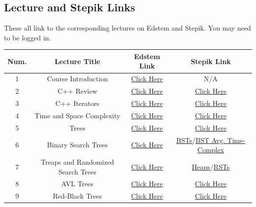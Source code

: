 \documentclass[letterpaper]{article}
\begin{document}
\subsection{Lecture and Stepik Links}
These all link to the corresponding lectures on Edstem and Stepik. You may need to be logged in.
\begin{center}
    \begin{tabular}{|c|c|c|c|}
        \hline 
        \textbf{Num.} & \textbf{Lecture Title} & \textbf{Edstem Link} & \textbf{Stepik Link} \\ 
        \hline 
        1 & Course Introduction & \href{https://edstem.org/us/courses/6609/lessons/22848/slides/131953}{Click Here} & N/A \\ 
        2 & C++ Review & \href{https://edstem.org/us/courses/6609/lessons/22849/slides/131958}{Click Here} & \href{https://stepik.org/lesson/26055/step/1?unit=8087}{Click Here} \\ 
        3 & C++ Iterators & \href{https://edstem.org/us/courses/6609/lessons/22850/slides/131970}{Click Here} & \href{https://stepik.org/lesson/26105/step/1?unit=11291}{Click Here} \\ 
        4 & Time and Space Complexity & \href{https://edstem.org/us/courses/6609/lessons/22853/slides/131982}{Click Here} & \href{https://stepik.org/lesson/26053/step/1?unit=8085}{Click Here} \\ 
        5 & Trees & \href{https://edstem.org/us/courses/6609/lessons/22854/slides/131990}{Click Here} & \href{https://stepik.org/lesson/28726/step/1?unit=9784}{Click Here} \\ 
        6 & Binary Search Trees & \href{https://edstem.org/us/courses/6609/lessons/22855/slides/131996}{Click Here} & \href{https://stepik.org/lesson/28727/step/1?unit=9785}{BSTs}/\href{https://stepik.org/lesson/28730/step/1?unit=9787}{BST Avg. Time-Complex} \\ 
        7 & Treaps and Randomized Search Trees & \href{https://edstem.org/us/courses/6609/lessons/22858/slides/132012}{Click Here} & \href{https://stepik.org/lesson/28863/step/1?unit=9900}{Heaps}/\href{https://stepik.org/lesson/28864/step/1?unit=9901}{RSTs} \\ 
        8 & AVL Trees & \href{https://edstem.org/us/courses/6609/lessons/22859/slides/132019}{Click Here} & \href{https://stepik.org/lesson/28865/step/1?unit=9903}{Click Here} \\ 
        9 & Red-Black Trees & \href{https://edstem.org/us/courses/6609/lessons/22860/slides/132026}{Click Here} & \href{https://stepik.org/lesson/28866/step/1?unit=9902}{Click Here} \\ 

\end{tabular}
\end{center}
\end{document}
